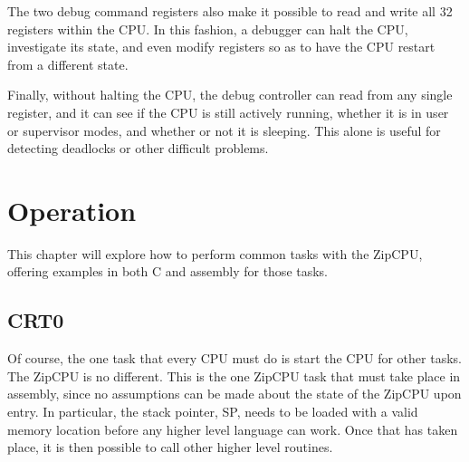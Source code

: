 \documentclass{gqtekspec}
\begin{document}
The two debug command registers also make it possible to read and write
all 32 registers within the CPU.  In this fashion, a debugger can halt the
CPU, investigate its state, and even modify registers so as to have the
CPU restart from a different state.

Finally, without halting the CPU, the debug controller can read from any
single register, and it can see if the CPU is still actively running, whether
it is in user or supervisor modes, and whether or not it is sleeping.  This
alone is useful for detecting deadlocks or other difficult problems.
\chapter{Operation}\label{chap:ops}
This chapter will explore how to perform common tasks with the ZipCPU,
offering examples in both C and assembly for those tasks.

\section{CRT0}

Of course, the one task that every CPU must do is start the CPU for other
tasks.  The ZipCPU is no different.  This is the one ZipCPU task that must
take place in assembly, since no assumptions can be made about the state of
the ZipCPU upon entry.  In particular, the stack pointer, SP, needs to be
loaded with a valid memory location before any higher level language can work.
Once that has taken place, it is then possible to call other higher level
routines.
\end{document}
